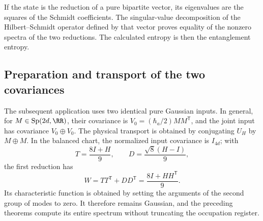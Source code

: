 If the state is the reduction of a pure bipartite vector, its eigenvalues are the squares of the Schmidt coefficients. The singular-value decomposition of the Hilbert--Schmidt operator defined by that vector proves equality of the nonzero spectra of the two reductions. The calculated entropy is then the entanglement entropy.

\subsection{Preparation and transport of the two covariances}
The subsequent application uses two identical pure Gaussian inputs. In general, for \(M\in\operatorname{Sp}(2d,\RR)\), their covariance is \(V_0=(\hbar_a/2)MM^{\mathsf T}\), and the joint input has covariance \(V_0\oplus V_0\). The physical transport is obtained by conjugating \(U_H\) by \(M\oplus M\). In the balanced chart, the normalized input covariance is \(I_{4d}\); with
\[
 T=\frac{8I+H}{9},\qquad D=\frac{\sqrt8(H-I)}9,
\]
the first reduction has
\[
 W=TT^{\mathsf T}+DD^{\mathsf T}=\frac{8I+HH^{\mathsf T}}9.
\]
Its characteristic function is obtained by setting the arguments of the second group of modes to zero. It therefore remains Gaussian, and the preceding theorems compute its entire spectrum without truncating the occupation register.
